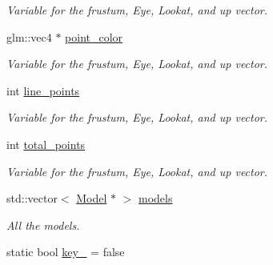 \begin{DoxyCompactItemize}
\begin{DoxyCompactList}\small\item\em Variable for the frustum, Eye, Lookat, and up vector. \end{DoxyCompactList}\item 
glm\+::vec4 $\ast$ \hyperlink{classcft_1_1Scene_a463f2eb19cee1910e13cdb7421bbd3bd}{point\+\_\+color}\hypertarget{classcft_1_1Scene_a463f2eb19cee1910e13cdb7421bbd3bd}{}\label{classcft_1_1Scene_a463f2eb19cee1910e13cdb7421bbd3bd}

\begin{DoxyCompactList}\small\item\em Variable for the frustum, Eye, Lookat, and up vector. \end{DoxyCompactList}\item 
int \hyperlink{classcft_1_1Scene_a39be0992b45b2bdebf72b1836ed3e75d}{line\+\_\+points}\hypertarget{classcft_1_1Scene_a39be0992b45b2bdebf72b1836ed3e75d}{}\label{classcft_1_1Scene_a39be0992b45b2bdebf72b1836ed3e75d}

\begin{DoxyCompactList}\small\item\em Variable for the frustum, Eye, Lookat, and up vector. \end{DoxyCompactList}\item 
int \hyperlink{classcft_1_1Scene_a2a239e0ae018cd4efe5104b037c324da}{total\+\_\+points}\hypertarget{classcft_1_1Scene_a2a239e0ae018cd4efe5104b037c324da}{}\label{classcft_1_1Scene_a2a239e0ae018cd4efe5104b037c324da}

\begin{DoxyCompactList}\small\item\em Variable for the frustum, Eye, Lookat, and up vector. \end{DoxyCompactList}\item 
std\+::vector$<$ \hyperlink{classcft_1_1Model}{Model} $\ast$ $>$ \hyperlink{classcft_1_1Scene_af28db916199219b8deceb5f1de0a1da7}{models}\hypertarget{classcft_1_1Scene_af28db916199219b8deceb5f1de0a1da7}{}\label{classcft_1_1Scene_af28db916199219b8deceb5f1de0a1da7}

\begin{DoxyCompactList}\small\item\em All the models. \end{DoxyCompactList}\item 
static bool \hyperlink{classcft_1_1Scene_a42dcab7914b95a4f1f002631807e6baf}{key\+\_} = false\hypertarget{classcft_1_1Scene_a42dcab7914b95a4f1f002631807e6baf}{}\label{classcft_1_1Scene_a42dcab7914b95a4f1f002631807e6baf}


\end{DoxyCompactItemize}

